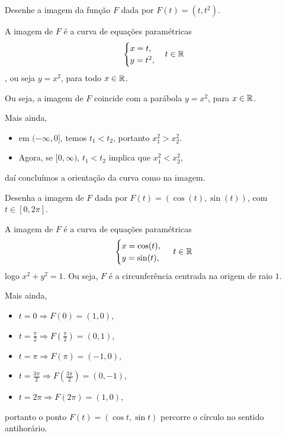 \begin{example}
    Desenhe a imagem da função \(F\) dada por \(F(t) = (t,t^2)\).

    A imagem de \(F\) é a curva de equações paramétricas \[\begin{cases}
        x = t, \\
        y = t^2,
    \end{cases} t\in \mathbb{R}\], ou seja \(y = x^2\), para todo \(x\in\mathbb{R}\).

    Ou seja, a imagem de \(F\) coincide com a parábola \(y = x^2\), para \(x\in\mathbb{R}\). %

    Mais ainda,
        \begin{itemize}
            \item em \((-\infty,0]\), temos \(t_1 < t_2\), portanto \(x_1^2 > x_2^2\).
            \item Agora, se \([0,\infty)\), \(t_1 < t_2\) implica que \(x_1^2 < x_2^2\),
        \end{itemize}
    daí concluímos a orientação da curva como na imagem.
\end{example}

\begin{example}
    Desenha a imagem de \(F\) dada por \(F(t) = (\cos(t),\sin(t))\), com \(t\in[0,2\pi]\).

    A imagem de \(F\) é a curva de equações paramétricas \[\begin{cases}
        x = \cos(t),\\
        y = \sin(t),
    \end{cases}\; t\in\mathbb{R}\] logo \(x^2 + y^2 = 1.\) Ou seja, \(F\) é a circunferência centrada na origem de raio \(1\). %

    Mais ainda,
        \begin{itemize}
            \item \(t = 0 \Rightarrow F(0) = (1,0)\),
            \item \(t = \frac{\pi}{2} \Rightarrow F\left(\frac{\pi}{2}\right) = (0,1)\),
            \item \(t = \pi \Rightarrow F(\pi) = (-1,0)\),
            \item \(t = \frac{3\pi}{2} \Rightarrow F\left( \frac{3\pi}{2} \right) = (0,-1)\),
            \item \(t = 2\pi \Rightarrow F(2\pi) = (1,0)\),
        \end{itemize}
    portanto o ponto \(F(t) = (\cos t,\sin t)\) percorre o círculo no sentido antihorário.
\end{example}

